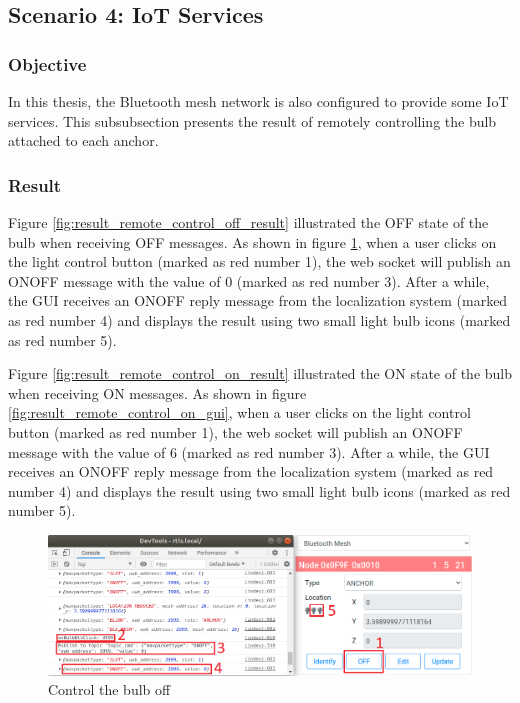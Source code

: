 \documentclass[\main/main.tex]{subfiles}
\begin{document}
\subsection{Scenario 4: IoT Services}
\subsubsection{Objective}
In this thesis, the Bluetooth mesh network is also configured to provide some IoT services. This subsubsection presents the result of remotely controlling the bulb attached to each anchor.
\subsubsection{Result}

Figure \ref{fig:result_remote_control_off_result} illustrated the OFF state of the bulb when receiving OFF messages. As shown in figure \ref{fig:result_remote_control_off_gui}, when a user clicks on the light control button (marked as red number 1), the web socket will publish an ONOFF message with the value of 0 (marked as red number 3). After a while, the GUI receives an ONOFF reply message from the localization system (marked as red number 4) and displays the result using two small light bulb icons (marked as red number 5).

Figure \ref{fig:result_remote_control_on_result} illustrated the ON state of the bulb when receiving ON messages. As shown in figure \ref{fig:result_remote_control_on_gui}, when a user clicks on the light control button (marked as red number 1), the web socket will publish an ONOFF message with the value of 6 (marked as red number 3). After a while, the GUI receives an ONOFF reply message from the localization system (marked as red number 4) and displays the result using two small light bulb icons (marked as red number 5).

\begin{figure}[H]
    \centering
    \includegraphics[width=1\textwidth]{result_remote_control_off_gui.png}
    \caption{Control the bulb off}
    \label{fig:result_remote_control_off_gui}
\end{figure}
\end{document}
